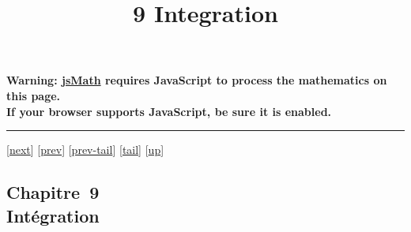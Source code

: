 \documentclass[]{article}
\title{9 Integration}
\author{}
\date{}
\begin{document}
\maketitle

\textbf{Warning: \href{http://www.math.union.edu/locate/jsMath}{jsMath}
requires JavaScript to process the mathematics on this page.\\ If your
browser supports JavaScript, be sure it is enabled.}

\begin{center}\rule{3in}{0.4pt}\end{center}

{[}\href{coursch11.html}{next}{]} {[}\href{coursch9.html}{prev}{]}
{[}\href{coursch9.html\#tailcoursch9.html}{prev-tail}{]}
{[}\hyperref[tailcoursch10.html]{tail}{]}
{[}\href{cours.html\#coursch10.html}{up}{]}

\subsection{Chapitre~9\\Intégration}
\end{document}
